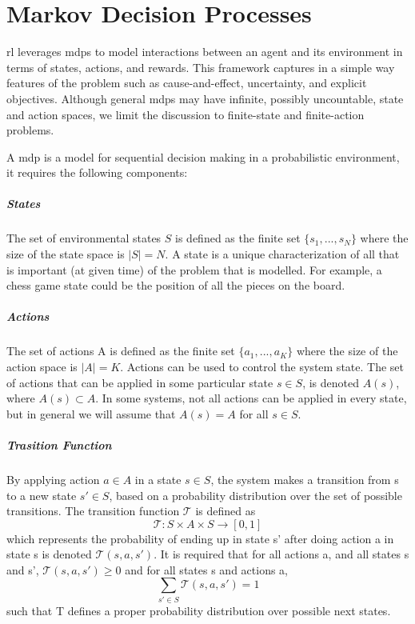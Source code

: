 
\chapter{Markov Decision Processes}

\gls{rl} leverages \glspl{mdp} to model interactions between 
an agent and its environment in terms of states, actions, and rewards. 
This framework captures in a simple way features of the problem such as cause-and-effect, 
uncertainty, and explicit objectives.
Although general \glspl{mdp} may have infinite, possibly uncountable, state and action
spaces, we limit the discussion to finite-state and finite-action problems.

A \gls{mdp} is a model for sequential decision making in a probabilistic environment, it requires
the following components:

\paragraph{States}
The set of environmental states $S$ is defined as the finite set $\{s_1 , . . . , s_N \}$ where the
size of the state space is $|S| = N$. A state is a unique characterization of all
that is important (at given time) of the problem that is modelled. For example, a chess game state 
could be the position of all the pieces on the board.

\paragraph{Actions}
The set of actions A is defined as the finite set $\{a_1 , . . . , a_K \}$ where the size of the
action space is $|A| = K$. Actions can be used to control the system state.
The set of actions that can be applied in some particular state $s \in S$, is denoted $A(s)$,
where $A(s) \subset A$. In some systems, not all actions can be applied in every state, but in
general we will assume that $A(s) = A$ for all $s \in S$.

\paragraph{Trasition Function}
By applying action $a \in A$ in a state $s \in S$, the system makes a transition from s to a
new state $s' \in S$, based on a probability distribution over the set of possible transitions. 
The transition function $\mathcal{T}$ is defined as 
$$\mathcal{T} : S \times A \times S \rightarrow [0,1]$$ which represents the probability
of ending up in state s' after doing action a in state s is denoted $ \mathcal{T}(s,a,s')$. It is required that 
for all actions a, and all states s and s', $\mathcal{T} (s,a,s') \geq 0$ and for all states s and actions a, 
$$\sum_{s' \in S} \mathcal{T} (s,a,s') = 1$$
such that T defines a proper probability distribution over possible next states. \

